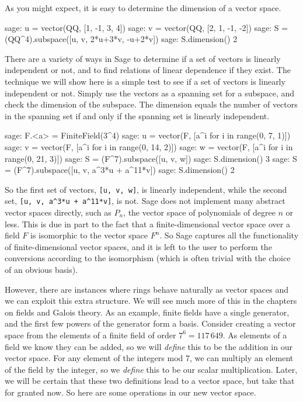 %
As you might expect, it is easy to determine the dimension of a vector space.
%
\begin{sageexample}
sage: u = vector(QQ, [1, -1,  3,  4])
sage: v = vector(QQ, [2,  1, -1, -2])
sage: S = (QQ^4).subspace([u, v, 2*u+3*v, -u+2*v])
sage: S.dimension()
2
\end{sageexample}
%
%
There are a variety of ways in Sage to determine if a set of vectors is linearly independent or not, and to find relations of linear dependence if they exist.  The technique we will show here is a simple test to see if a set of vectors is linearly independent or not.  Simply use the vectors as a spanning set for a subspace, and check the dimension of the subspace.  The dimension equals the number of vectors in the spanning set if and only if the spanning set is linearly independent.
%
\begin{sageexample}
sage: F.<a> = FiniteField(3^4)
sage: u = vector(F, [a^i for i in range(0,  7, 1)])
sage: v = vector(F, [a^i for i in range(0, 14, 2)])
sage: w = vector(F, [a^i for i in range(0, 21, 3)])
sage: S = (F^7).subspace([u, v, w])
sage: S.dimension()
3
sage: S = (F^7).subspace([u, v, a^3*u + a^11*v])
sage: S.dimension()
2
\end{sageexample}
%
So the first set of vectors, \verb?[u, v, w]?, is linearly independent, while the second set, \verb?[u, v, a^3*u + a^11*v]?, is not.
%
%
Sage does not implement many abstract vector spaces directly, such as $P_n$, the vector space of polynomials of degree $n$ or less.  This is due in part to the fact that a finite-dimensional vector space over a field $F$ is isomorphic to the vector space $F^n$.  So Sage captures all the functionality of finite-dimensional vector spaces, and it is left to the user to perform the conversions according to the isomorphism (which is often trivial with the choice of an obvious basis).\par
%
However, there are instances where rings behave naturally as vector spaces and we can exploit this extra structure.  We will see much more of this in the chapters on fields and Galois theory.  As an example, finite fields have a single generator, and the first few powers of the generator form a basis.  Consider creating a vector space from the elements of a finite field of order $7^6=117\,649$.  As elements of a field we know they can be added, so we will \emph{define} this to be the addition in our vector space.  For any element of the integers mod 7, we can multiply an element of the field by the integer, so we \emph{define} this to be our scalar multiplication.  Later, we will be certain that these two definitions lead to a vector space, but take that for granted now.  So here are some operations in our new vector space.
